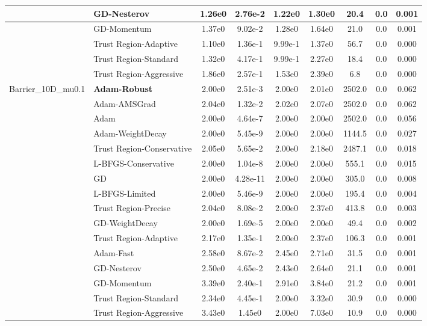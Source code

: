 \documentclass{article}
\begin{document}
\begin{longtable}{|l|l|c|c|c|c|c|c|c|}
\hline
 & GD-Nesterov & 1.26e0 & 2.76e-2 & 1.22e0 & 1.30e0 & 20.4 & 0.0 & 0.001 \\
\hline
 & GD-Momentum & 1.37e0 & 9.02e-2 & 1.28e0 & 1.64e0 & 21.0 & 0.0 & 0.001 \\
\hline
 & Trust Region-Adaptive & 1.10e0 & 1.36e-1 & 9.99e-1 & 1.37e0 & 56.7 & 0.0 & 0.000 \\
\hline
 & Trust Region-Standard & 1.32e0 & 4.17e-1 & 9.99e-1 & 2.27e0 & 18.4 & 0.0 & 0.000 \\
\hline
 & Trust Region-Aggressive & 1.86e0 & 2.57e-1 & 1.53e0 & 2.39e0 & 6.8 & 0.0 & 0.000 \\
Barrier\_10D\_mu0.1 & \textbf{Adam-Robust} & 2.00e0 & 2.51e-3 & 2.00e0 & 2.01e0 & 2502.0 & 0.0 & 0.062 \\
\hline
 & Adam-AMSGrad & 2.04e0 & 1.32e-2 & 2.02e0 & 2.07e0 & 2502.0 & 0.0 & 0.062 \\
\hline
 & Adam & 2.00e0 & 4.64e-7 & 2.00e0 & 2.00e0 & 2502.0 & 0.0 & 0.056 \\
\hline
 & Adam-WeightDecay & 2.00e0 & 5.45e-9 & 2.00e0 & 2.00e0 & 1144.5 & 0.0 & 0.027 \\
\hline
 & Trust Region-Conservative & 2.05e0 & 5.65e-2 & 2.00e0 & 2.18e0 & 2487.1 & 0.0 & 0.018 \\
\hline
 & L-BFGS-Conservative & 2.00e0 & 1.04e-8 & 2.00e0 & 2.00e0 & 555.1 & 0.0 & 0.015 \\
\hline
 & GD & 2.00e0 & 4.28e-11 & 2.00e0 & 2.00e0 & 305.0 & 0.0 & 0.008 \\
\hline
 & L-BFGS-Limited & 2.00e0 & 5.46e-9 & 2.00e0 & 2.00e0 & 195.4 & 0.0 & 0.004 \\
\hline
 & Trust Region-Precise & 2.04e0 & 8.08e-2 & 2.00e0 & 2.37e0 & 413.8 & 0.0 & 0.003 \\
\hline
 & GD-WeightDecay & 2.00e0 & 1.69e-5 & 2.00e0 & 2.00e0 & 49.4 & 0.0 & 0.002 \\
\hline
 & Trust Region-Adaptive & 2.17e0 & 1.35e-1 & 2.00e0 & 2.37e0 & 106.3 & 0.0 & 0.001 \\
\hline
 & Adam-Fast & 2.58e0 & 8.67e-2 & 2.45e0 & 2.71e0 & 31.5 & 0.0 & 0.001 \\
\hline
 & GD-Nesterov & 2.50e0 & 4.65e-2 & 2.43e0 & 2.64e0 & 21.1 & 0.0 & 0.001 \\
\hline
 & GD-Momentum & 3.39e0 & 2.40e-1 & 2.91e0 & 3.84e0 & 21.2 & 0.0 & 0.001 \\
\hline
 & Trust Region-Standard & 2.34e0 & 4.45e-1 & 2.00e0 & 3.32e0 & 30.9 & 0.0 & 0.000 \\
\hline
 & Trust Region-Aggressive & 3.43e0 & 1.45e0 & 2.00e0 & 7.03e0 & 10.9 & 0.0 & 0.000 \\

\end{longtable}
\end{document}
